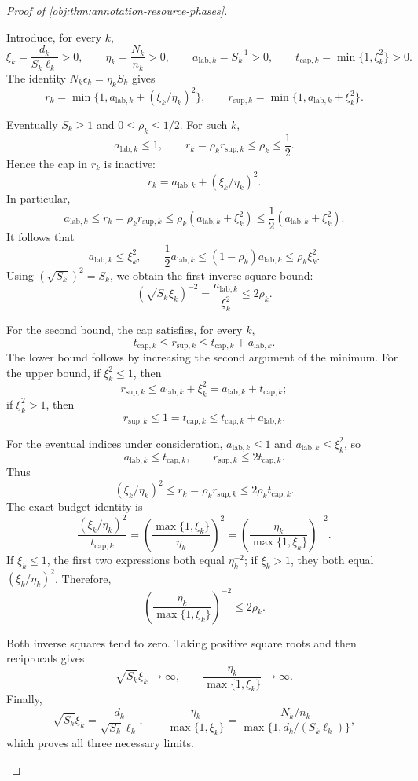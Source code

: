 \documentclass[11pt]{article}
\begin{document}
\begin{proof}[Proof of \cref{obj:thm:annotation-resource-phases}]
\begin{enumerate}
Introduce, for every \(k\),
\[
\xi_k=\frac{d_k}{S_k\ell_k}>0,\qquad
\eta_k=\frac{N_k}{n_k}>0,\qquad
a_{\mathrm{lab},k}=S_k^{-1}>0,\qquad
t_{\mathrm{cap},k}=\min\{1,\xi_k^2\}>0.
\]
The identity \(N_k\epsilon_k=\eta_kS_k\) gives
\[
r_k=\min\{1,a_{\mathrm{lab},k}+(\xi_k/\eta_k)^2\},
\qquad
r_{\mathrm{sup},k}=\min\{1,a_{\mathrm{lab},k}+\xi_k^2\}.
\]

Eventually \(S_k\ge1\) and \(0\le\rho_k\le1/2\). For such \(k\),
\[
a_{\mathrm{lab},k}\le1,\qquad
r_k=\rho_kr_{\mathrm{sup},k}\le\rho_k\le\frac12.
\]
Hence the cap in \(r_k\) is inactive:
\[
r_k=a_{\mathrm{lab},k}+(\xi_k/\eta_k)^2.
\]
In particular,
\[
a_{\mathrm{lab},k}
\le r_k
=\rho_kr_{\mathrm{sup},k}
\le\rho_k(a_{\mathrm{lab},k}+\xi_k^2)
\le\frac12(a_{\mathrm{lab},k}+\xi_k^2).
\]
It follows that
\[
a_{\mathrm{lab},k}\le\xi_k^2,
\qquad
\frac12a_{\mathrm{lab},k}
\le(1-\rho_k)a_{\mathrm{lab},k}
\le\rho_k\xi_k^2.
\]
Using \((\sqrt{S_k})^2=S_k\), we obtain the first inverse-square bound:
\[
(\sqrt{S_k}\xi_k)^{-2}
=\frac{a_{\mathrm{lab},k}}{\xi_k^2}
\le2\rho_k.
\]

For the second bound, the cap satisfies, for every \(k\),
\[
t_{\mathrm{cap},k}\le r_{\mathrm{sup},k}
\le t_{\mathrm{cap},k}+a_{\mathrm{lab},k}.
\]
The lower bound follows by increasing the second argument of the minimum. For the upper bound, if \(\xi_k^2\le1\), then
\[
r_{\mathrm{sup},k}\le a_{\mathrm{lab},k}+\xi_k^2
=a_{\mathrm{lab},k}+t_{\mathrm{cap},k};
\]
if \(\xi_k^2>1\), then
\[
r_{\mathrm{sup},k}\le1=t_{\mathrm{cap},k}
\le t_{\mathrm{cap},k}+a_{\mathrm{lab},k}.
\]

For the eventual indices under consideration,
\(a_{\mathrm{lab},k}\le1\) and
\(a_{\mathrm{lab},k}\le\xi_k^2\), so
\[
a_{\mathrm{lab},k}\le t_{\mathrm{cap},k},
\qquad
r_{\mathrm{sup},k}\le2t_{\mathrm{cap},k}.
\]
Thus
\[
(\xi_k/\eta_k)^2
\le r_k
=\rho_kr_{\mathrm{sup},k}
\le2\rho_kt_{\mathrm{cap},k}.
\]
The exact budget identity is
\[
\frac{(\xi_k/\eta_k)^2}{t_{\mathrm{cap},k}}
=
\left(\frac{\max\{1,\xi_k\}}{\eta_k}\right)^2
=
\left(\frac{\eta_k}{\max\{1,\xi_k\}}\right)^{-2}.
\]
If \(\xi_k\le1\), the first two expressions both equal
\(\eta_k^{-2}\); if \(\xi_k>1\), they both equal
\((\xi_k/\eta_k)^2\). Therefore,
\[
\left(\frac{\eta_k}{\max\{1,\xi_k\}}\right)^{-2}
\le2\rho_k.
\]

Both inverse squares tend to zero. Taking positive square roots and then reciprocals gives
\[
\sqrt{S_k}\xi_k\longrightarrow\infty,
\qquad
\frac{\eta_k}{\max\{1,\xi_k\}}\longrightarrow\infty.
\]
Finally,
\[
\sqrt{S_k}\xi_k
=\frac{d_k}{\sqrt{S_k}\ell_k},
\qquad
\frac{\eta_k}{\max\{1,\xi_k\}}
=
\frac{N_k/n_k}{\max\{1,d_k/(S_k\ell_k)\}},
\]
which proves all three necessary limits.


\end{enumerate}
\end{proof}
\end{document}
